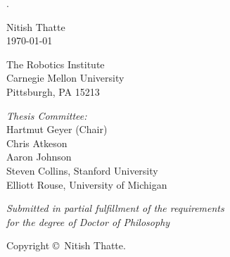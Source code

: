 \documentclass[]{tufte-book}
\begin{document}
\frontmatter

\begin{titlepage}
	\begin{fullwidth}
	\centering
    \phantom.
    \vspace{0.5in}
    {\huge{\thesistitle}\par}
    \vspace{0.5in}
    
    Nitish Thatte \\
    \today \\
    \vspace{0.9 in}
    
    The Robotics Institute \\
    Carnegie Mellon University \\
    Pittsburgh, PA 15213
    \vspace{0.9 in}
    
   	{\it Thesis Committee:}\\
    Hartmut Geyer (Chair)\\
    Chris Atkeson\\
    Aaron Johnson\\
    Steven Collins, Stanford University\\
    Elliott Rouse, University of Michigan\\
    \vspace{0.9 in}
   
   	{\it Submitted in partial fulfillment of the requirements\\ for the degree of Doctor of Philosophy}\\
    \vspace{0.9 in}
    
    Copyright \copyright \the\year \ Nitish Thatte.
 	\end{fullwidth}
\end{titlepage}





\tableofcontents

\listoffigures

\listoftables

\end{document}
